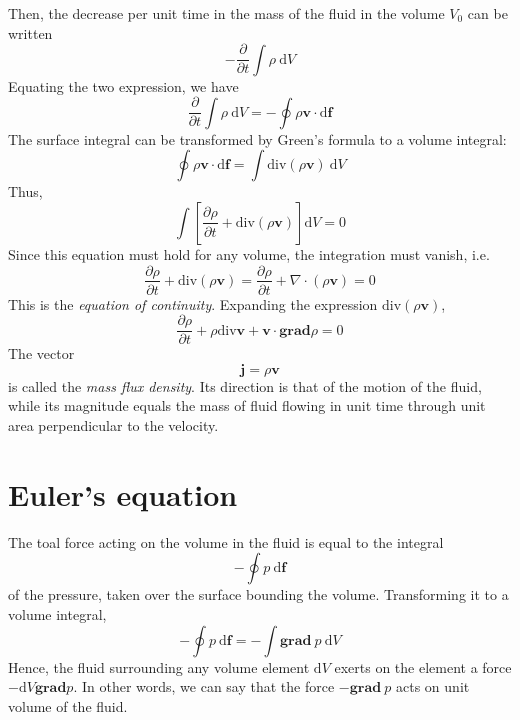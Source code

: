 \documentclass[conference]{IEEEtran}
\theoremstyle{definition}
\theoremstyle{remark}
\begin{document}
    Then, the decrease per unit time in the mass of the fluid in the volume $V_0$ can be written
    \[
        -\dfrac{\partial}{\partial t} \int \rho \ \mathrm{d} V
    \]
    Equating the two expression, we have
    \[
        \dfrac{\partial}{\partial t} \int \rho \ \mathrm{d} V = - \oint \rho \mathbf{v} \cdot \mathrm{d} \mathbf{f}
    \]
    The surface integral can be transformed by Green's formula to a volume integral:
    \[
        \oint \rho \mathbf{v} \cdot \mathrm{d} \mathbf{f} = \int \mathrm{div} (\rho \mathbf{v}) \ \mathrm{d} V
    \]
    Thus,
    \[
        \int \left[ \dfrac{\partial \rho}{\partial t} + \mathrm{div} (\rho \mathbf{v}) \right] \mathrm{d} V = 0
    \]
    Since this equation must hold for any volume, the integration must vanish, i.e.
    \begin{equation}
        \dfrac{\partial \rho}{\partial t} + \mathrm{div} (\rho \mathbf{v}) = \dfrac{\partial \rho}{\partial t} + \nabla \cdot (\rho \mathbf{v}) = 0
        \label{eq:continuity}
    \end{equation}
    This is the \emph{equation of continuity}. Expanding the expression $\text{div} (\rho \mathbf{v})$,
    \begin{equation}
        \dfrac{\partial \rho}{\partial t} + \rho \text{div} \mathbf{v} + \mathbf{v} \cdot \textbf{grad} \rho = 0
    \end{equation}
    The vector
    \begin{equation}
        \mathbf{j} = \rho \mathbf{v}
    \end{equation}
    is called the \emph{mass flux density}. Its direction is that of the motion of the fluid, while its magnitude equals the mass of fluid flowing in unit time through unit area perpendicular to the velocity.

    \section{Euler's equation}
    The toal force acting on the volume in the fluid is equal to the integral
    \[
        -\oint p \ \mathrm{d} \mathbf{f}
    \]
    of the pressure, taken over the surface bounding the volume. Transforming it to a volume integral,
    \[
        -\oint p \ \mathrm{d} \mathbf{f} = - \int \textbf{grad} \ p \ \mathrm{d} V
    \]
    Hence, the fluid surrounding any volume element $\mathrm{d} V$ exerts on the element a force $-\mathrm{d} V \textbf{grad} p$. In other words, we can say that the force $-\textbf{grad} \ p$ acts on unit volume of the fluid.
\end{document}

